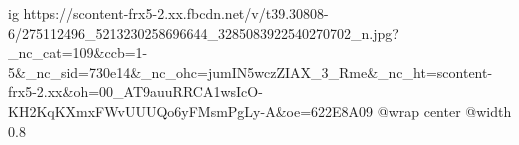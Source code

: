  
 
 
 
 

\ifcmt
  ig https://scontent-frx5-2.xx.fbcdn.net/v/t39.30808-6/275112496_5213230258696644_3285083922540270702_n.jpg?_nc_cat=109&ccb=1-5&_nc_sid=730e14&_nc_ohc=jumIN5wczZIAX_3_Rme&_nc_ht=scontent-frx5-2.xx&oh=00_AT9auuRRCA1wsIcO-KH2KqKXmxFWvUUUQo6yFMsmPgLy-A&oe=622E8A09
  @wrap center
  @width 0.8
\fi
